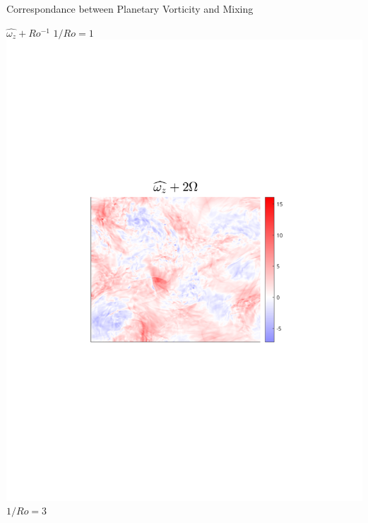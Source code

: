 \documentclass[aspecttatio=169]{beamer}
\begin{document}
\begin{frame}{Correspondance between Planetary Vorticity and Mixing}

    \centering
        \centering
        {\footnotesize $\widehat{\omega_z} + Ro^{-1}$}
    \emp
        \centering
        $1/Ro = 1$
        \includegraphics[width=1\textwidth]{images/Om1B30_vortz_bar.pdf}
    \emp
        \centering
        $1/Ro = 3$

\end{frame}
\end{document}
